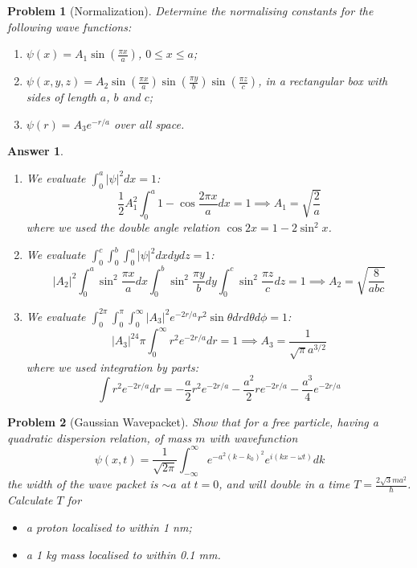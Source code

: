 \documentclass[a4paper]{article}
\newtheorem{ans}{Answer}[section]
\theoremstyle{new}
\newtheorem{qns}{Problem}[section]
\begin{document}
\begin{qns}[Normalization]
Determine the normalising constants for the following wave functions:
\begin{enumerate}[label=(\alph*)]
    \item $\psi(x)=A_1\sin(\frac{\pi x}{a})$, $0\leq x\leq a$;
    \item $\psi(x,y,z)=A_2\sin(\frac{\pi x}{a})\sin(\frac{\pi y}{b})\sin(\frac{\pi z}{c})$, in a rectangular box with sides of length $a$, $b$ and $c$;
    \item $\psi(r)=A_3e^{-r/a}$ over all space.
\end{enumerate}
\end{qns}
\begin{ans}\leavevmode
\begin{enumerate}[label=(\alph*)]
\item We evaluate $\int_0^a|\psi|^2dx=1$:
$$\frac{1}{2}A_1^2\int_0^a1-\cos\frac{2\pi x}{a}dx=1\implies A_1=\sqrt{\frac{2}{a}}$$
where we used the double angle relation $\cos2x=1-2\sin^2x$.
\item We evaluate $\int_0^c\int_0^b\int_0^a|\psi|^2dxdydz=1$:
$$|A_2|^2\int_0^a\sin^2\frac{\pi x}{a}dx\int_0^b\sin^2\frac{\pi y}{b}dy\int_0^c\sin^2\frac{\pi z}{c}dz=1\implies A_2=\sqrt{\frac{8}{abc}}$$
\item We evaluate $\int_0^{2\pi}\int_0^\pi\int_0^\infty|A_3|^2e^{-2r/a}r^2\sin\theta drd\theta d\phi=1$:
$$|A_3|^24\pi\int_0^\infty r^2e^{-2r/a}dr=1\implies A_3=\frac{1}{\sqrt{\pi}a^{3/2}}$$
where we used integration by parts: 
$$\int r^2e^{-2r/a}dr=-\frac{a}{2}r^2e^{-2r/a}-\frac{a^2}{2}re^{-2r/a}-\frac{a^3}{4}e^{-2r/a}$$
\end{enumerate}
\end{ans}
\newpage
\begin{qns}[Gaussian Wavepacket]
Show that for a free particle, having a quadratic dispersion relation, of mass $m$ with wavefunction
$$\psi(x,t)=\frac{1}{\sqrt{2\pi}}\int_{-\infty}^\infty e^{-a^2(k-k_0)^2}e^{i(kx-\omega t)}dk$$
the width of the wave packet is $\sim a$ at $t = 0$, and will double in a time $T=\frac{2\sqrt{3}ma^2}{\hbar}$.\\[5pt]
Calculate $T$ for
\begin{itemize}
    \item a proton localised to within 1 nm;
    \item a 1 kg mass localised to within 0.1 mm. 
\end{itemize}
\end{qns}
\end{document}
